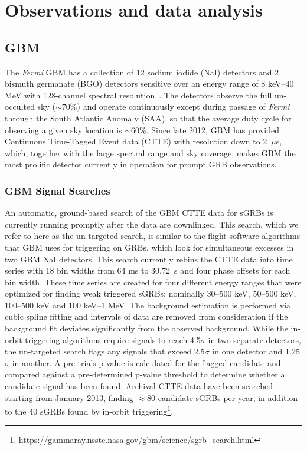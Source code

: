 \documentclass{aastex61}
\begin{document}
\section{Observations and data analysis}

\subsection{GBM}
The {\it Fermi} GBM has a collection of 12 sodium iodide (NaI) detectors and 2 bismuth germanate (BGO) detectors sensitive over an energy range of 8 keV--40 MeV with 128-channel spectral resolution~\citep{Meegan09}. The detectors observe the full un-occulted sky ($\sim 70\%$) and operate continuously except during passage of {\it Fermi} through the South Atlantic Anomaly (SAA), so that the average duty cycle for observing a given sky location is $\sim$60\%.  Since late 2012, GBM has provided Continuous Time-Tagged Event data (CTTE) with resolution down to 2~$\mu$s, which, together with the large spectral range and sky coverage, makes GBM the most prolific detector currently in operation for prompt GRB observations.

\subsubsection{GBM Signal Searches}
An automatic, ground-based search of the GBM CTTE data for sGRBs is currently running promptly after the data are downlinked.  This search, which we refer to here as the un-targeted search, is similar to the flight software algorithms that GBM uses for triggering on GRBs, which look for simultaneous excesses in two GBM NaI detectors. This search currently rebins the CTTE data into time series with 18 bin widths from 64 ms to 30.72~s and four phase offsets for each bin width.  These time series are created for four different energy ranges that were optimized for finding weak triggered sGRBs: nominally 30--500 keV, 50--500 keV, 100--500 keV and 100 keV--1 MeV.  The background estimation is performed via cubic spline fitting and intervals of data are removed from consideration if the background fit deviates significantly from the observed background.  While the in-orbit triggering algorithms require signals to reach 4.5$\sigma$ in two separate detectors, the un-targeted search flags any signals that exceed 2.5$\sigma$ in one detector and 1.25$\sigma$ in another.  A pre-trials p-value is calculated for the flagged candidate and compared against a pre-determined p-value threshold to determine whether a candidate signal has been found.  Archival CTTE data have been searched starting from January 2013, finding $\approx$80 candidate sGRBs  per year, in addition to the 40 sGRBs found by in-orbit triggering\footnote{\url{https://gammaray.nsstc.nasa.gov/gbm/science/sgrb_search.html}}.
\end{document}
